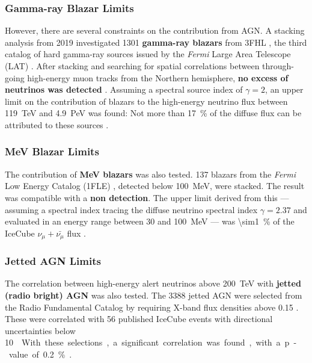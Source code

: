 \subsubsection{Gamma-ray Blazar Limits}
However, there are several constraints on the contribution from AGN\@. A stacking analysis from 2019 investigated 1301 \textbf{gamma-ray blazars} from 3FHL , the third catalog of hard gamma-ray sources issued by the \textit{Fermi} Large Area Telescope (LAT) . After stacking and searching for spatial correlations between through-going high-energy muon tracks from the Northern hemisphere, \textbf{no excess of neutrinos was detected} . Assuming a spectral source index of $\gamma=2$, an upper limit on the contribution of blazars to the high-energy neutrino flux between \SI{119}{\tera\eV} and \SI{4.9}{\peta\eV} was found: Not more than \SI{17}{\percent} of the diffuse flux can be attributed to these sources .

\subsubsection{MeV Blazar Limits}
The contribution of \textbf{MeV blazars} was also tested. 137 blazars from the \textit{Fermi} Low Energy Catalog (1FLE) , detected below \SI{100}{\mega\eV}, were stacked. The result was compatible with a \textbf{non detection}. The upper limit derived from this --- assuming a spectral index tracing the diffuse neutrino spectral index $\gamma=2.37$ and evaluated in an energy range between 30 and \SI{100}{\mega\eV} --- was \SI{\sim1}{\percent} of the IceCube $\nu_\mu+\bar{\nu_\mu}$ flux .

\subsubsection{Jetted AGN Limits}

The correlation between high-energy alert neutrinos above \SI{200}{\tera\eV} with \textbf{jetted (radio bright) AGN} was also tested. The 3388 jetted AGN were selected from the Radio Fundamental Catalog by requiring X-band flux densities above 0.15 \unit{\jansky}. These were correlated with 56 published IceCube events with directional uncertainties below \SI{10}{\square\deg}. With these selections, a significant correlation was found, with a p-value of \SI{0.2}{\percent} .

